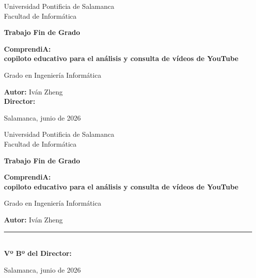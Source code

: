 \begin{titlepage}
  \centering
  {\large Universidad Pontificia de Salamanca\\Facultad de Informática\par}
  \vfill
  {\Large\bfseries Trabajo Fin de Grado\par}
  \vspace{1.5cm}
  {\huge\bfseries ComprendiA:\\[0.4cm] copiloto educativo para el análisis y consulta de vídeos de YouTube\par}
  \vspace{2cm}
  {\large Grado en Ingeniería Informática\par}
  \vfill
  \begin{flushright}
    \large
    \textbf{Autor:} Iván Zheng\\[0.4cm]
    \textbf{Director:} %
  \end{flushright}
  \vfill
  {\large Salamanca, junio de 2026\par} %
\end{titlepage}
\thispagestyle{empty}

\cleardoublepage
\begin{titlepage}
  \centering
  {\large Universidad Pontificia de Salamanca\\Facultad de Informática\par}
  \vfill
  {\Large\bfseries Trabajo Fin de Grado\par}
  \vspace{1.5cm}
  {\huge\bfseries ComprendiA:\\[0.4cm] copiloto educativo para el análisis y consulta de vídeos de YouTube\par}
  \vspace{2cm}
  {\large Grado en Ingeniería Informática\par}
  \vfill
  \begin{flushright}
    \large
    \textbf{Autor:} Iván Zheng\\[1.2cm]
    \rule{6cm}{0.4pt}\\[0.2cm]      %
    \textbf{Vº Bº del Director:} %
  \end{flushright}
  \vfill
  {\large Salamanca, junio de 2026\par}
\end{titlepage}
\thispagestyle{empty}

\cleardoublepage
\thispagestyle{empty}
\mbox{}
